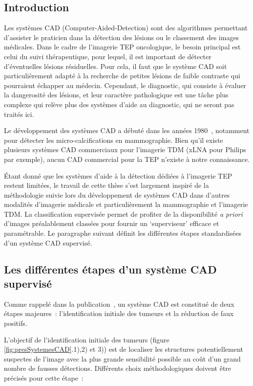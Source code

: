 \subsection{Introduction}

Les systèmes CAD (Computer-Aided-Detection) sont des algorithmes permettant d'assister le praticien dans la détection des lésions ou le classement des images médicales. Dans le cadre de l'imagerie TEP oncologique, le besoin principal est celui du suivi thérapeutique, pour lequel, il est important de détecter d'éventuelles lésions résiduelles. Pour cela, il faut que le système CAD soit particulièrement adapté à la recherche de petites lésions de faible contraste qui pourraient échapper au médecin. Cependant, le diagnostic, qui consiste à évaluer la dangerosité des lésions, et leur caractère pathologique est une tâche plus complexe qui relève plus des systèmes d'aide au diagnostic, qui ne seront pas traités ici.

Le développement des systèmes CAD a débuté dans les années 1980~\cite{chan1987image}, notamment pour détecter les micro-calcifications en mammographie. Bien qu'il existe plusieurs systèmes CAD commerciaux pour l'imagerie TDM (xLNA pour Philips par exemple), aucun CAD commercial pour la TEP n'existe à notre connaissance.

\'Etant donné que les systèmes d’aide à la détection dédiées à l’imagerie TEP restent limitées,  le travail de cette thèse s’est largement inspiré de la méthodologie suivie lors du développement de systèmes CAD dans d’autres modalités d’imagerie médicale et particulièrement la mammographie et l’imagerie TDM. La classification supervisée permet de profiter de la disponibilité \textit{a priori} d’images préalablement classées pour fournir un ‘superviseur’ efficace et paramétrable. Le paragraphe suivant définit les différentes étapes standardisées d’un système CAD supervisé.


\subsection{Les différentes étapes d’un système CAD supervisé}

Comme rappelé dans la publication~\cite{li2007recent}, un système CAD est constitué de deux étapes majeures : l’identification initiale des tumeurs et la réduction de faux positifs. 

L’objectif de l’identification initiale des tumeurs (figure \ref{fig:presSystemesCAD}.1),2) et 3)) est de localiser les structures potentiellement suspectes de l’image avec la plus grande sensibilité possible au coût d’un grand nombre de fausses détections. Différents choix méthodologiques doivent être précisés pour cette étape :


